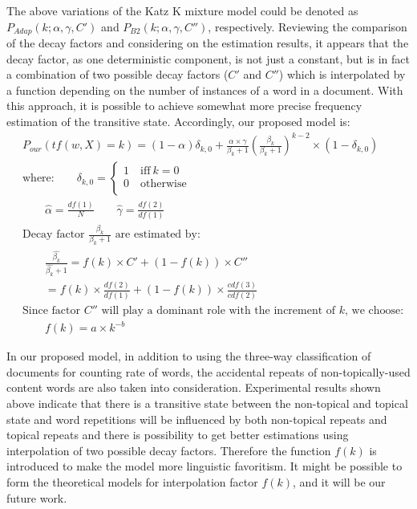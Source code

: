 \documentclass[english]{jnlp_1.4_rep}
\begin{document}
The above variations of the Katz K mixture model could be denoted as $P_{\mathit{Adap}}(k;\alpha,\gamma,C')$ and $P_{B2}(k;\alpha,\gamma,C'')$,
respectively. Reviewing the comparison of the decay factors and considering on the estimation results, it appears that the decay factor, as one
deterministic component, is not just a constant, but is in fact a combination of two possible decay factors ($C'$ and $C''$) which is interpolated
by a function depending on the number of instances of a word in a document. With this approach, it is possible to achieve somewhat more precise
frequency estimation of the transitive state. Accordingly, our proposed model is:
{\allowdisplaybreaks
\begin{align*}
 & P_{\mathit{our}}(\mathit{tf}(w,X)=k) = (1 - \alpha)\delta_{k,0} + \frac{\alpha \times \gamma }{\beta_{k} + 1}
	\left(\frac{\beta_{k}}{\beta_{k} + 1}\right)^{k -2}\times(1-\delta_{k,0}) \\
 & \mbox{where:} \qquad
	\delta _{k,0}= \left\{\begin{array}{l}
		1 \quad \mbox{iff}\ k = 0 \\
		0 \quad \mbox{otherwise} \\
	    \end{array} \right. \\
 & \qquad \hat{\alpha}  = \frac{\mathit{df}(1)}{N} \qquad \hat{\gamma}  = \frac{\mathit{df}(2)}{\mathit{df}(1)} \\
 & \mbox{Decay factor $\frac{\beta_{k}}{\beta_{k}+1}$ are estimated by:} \\
 & \qquad \frac{\hat{\beta_{k}}}{\hat{\beta_{k}}+1}
                    = f(k) \times C' + (1-f(k))\times C'' \\
 & \quad \quad = f(k) \times \frac{\mathit{df}(2)}{\mathit{df}(1)} + (1-f(k))\times \frac{\mathit{cdf}(3)}{\mathit{cdf}(2)} \\
 & \mbox{Since factor $C''$ will play a dominant role with the increment of $k$, we choose:} \\
 & \qquad f(k) = a \times k^{-b}
\end{align*}
}

In our proposed model, in addition to using the three-way classification of documents for counting rate of words, the accidental repeats of
non-topically-used content words are also taken into consideration. Experimental results shown above indicate that there is a transitive state
between the non-topical and topical state and word repetitions will be influenced by both non-topical repeats and topical repeats and there is
possibility to get better estimations using interpolation of two possible decay factors. Therefore the function $f(k)$ is introduced to make the
model more linguistic favoritism. It might be possible to form the theoretical models for interpolation factor $f(k)$, and it will be our future
work.
\end{document}
